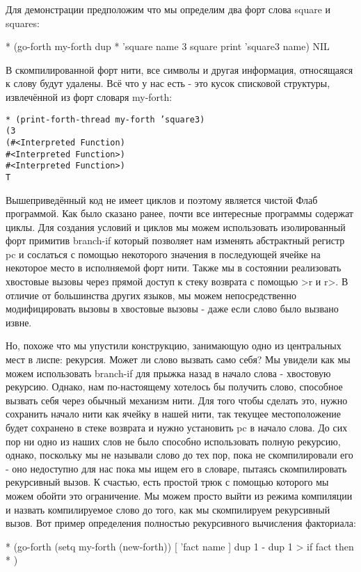 {{{Для демонстрации предположим что мы определим два форт слова square и squares:

* (go-forth my-forth
{ dup * } ’square name
{ 3 square print } ’square3 name)
NIL

В скомпилированной форт нити, все символы и другая информация, относящаяся к слову будут удалены. Всё что у нас есть - это кусок списковой структуры, извлечённой из форт словаря my-forth:

\begin{verbatim}
* (print-forth-thread my-forth ’square3)
(3
(#<Interpreted Function)
#<Interpreted Function>)
#<Interpreted Function>)
T
\end{verbatim}

Вышеприведённый код не имеет циклов и поэтому является чистой Флаб программой. Как было сказано ранее, почти все интересные программы содержат циклы. Для создания условий и циклов мы можем использовать изолированный форт примитив branch-if который позволяет нам изменять абстрактный регистр pc и сослаться с помощью некоторого значения в последующей ячейке на некоторое место в исполняемой форт нити. Также мы в состоянии реализовать хвостовые вызовы через прямой доступ к стеку возврата с помощью >r и r>. В отличие от большинства других языков, мы можем непосредственно модифицировать вызовы в хвостовые вызовы - даже если слово было вызвано извне.

Но, похоже что мы упустили конструкцию, занимающую одно из центральных мест в лиспе: рекурсия. Может ли слово вызвать само себя? Мы увидели как мы можем использовать branch-if для прыжка назад в начало слова - хвостовую рекурсию. Однако, нам по-настоящему хотелось бы получить слово, способное вызвать себя через обычный механизм нити. Для того чтобы сделать это, нужно сохранить начало нити как ячейку в нашей нити, так текущее местоположение будет сохранено в стеке возврата и нужно установить pc в начало слова. До сих пор ни одно из наших слов не было способно использовать полную рекурсию, однако, поскольку мы не называли слово до тех пор, пока не скомпилировали его - оно недоступно для нас пока мы ищем его в словаре, пытаясь скомпилировать рекурсивный вызов. К счастью, есть простой трюк с помощью которого мы можем обойти это ограничение. Мы можем просто выйти из режима компиляции и назвать компилируемое слово до того, как мы скомпилируем рекурсивный вызов. Вот пример определения полностью рекурсивного вычисления факториала:

* (go-forth (setq my-forth (new-forth))
{ [ ’fact name ]
dup 1 -
dup 1 > if fact then
* })

}}}
